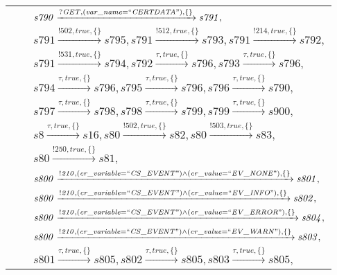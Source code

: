 \begin{tabular}{lcp{350px}}
& & $\mathit{s790}\xrightarrow{\mathit{?GET}, \mathit{(var\_name = ``CERTDATA")}, \{\}}\mathit{s791},$ \\
& & $\mathit{s791}\xrightarrow{\mathit{!502}, \mathit{true}, \{\}}\mathit{s795},\mathit{s791}\xrightarrow{\mathit{!512}, \mathit{true}, \{\}}\mathit{s793},\mathit{s791}\xrightarrow{\mathit{!214}, \mathit{true}, \{\}}\mathit{s792},$ \\
& & $\mathit{s791}\xrightarrow{\mathit{!531}, \mathit{true}, \{\}}\mathit{s794},\mathit{s792}\xrightarrow{\mathit{\tau}, \mathit{true}, \{\}}\mathit{s796},\mathit{s793}\xrightarrow{\mathit{\tau}, \mathit{true}, \{\}}\mathit{s796},$ \\
& & $\mathit{s794}\xrightarrow{\mathit{\tau}, \mathit{true}, \{\}}\mathit{s796},\mathit{s795}\xrightarrow{\mathit{\tau}, \mathit{true}, \{\}}\mathit{s796},\mathit{s796}\xrightarrow{\mathit{\tau}, \mathit{true}, \{\}}\mathit{s790},$ \\
& & $\mathit{s797}\xrightarrow{\mathit{\tau}, \mathit{true}, \{\}}\mathit{s798},\mathit{s798}\xrightarrow{\mathit{\tau}, \mathit{true}, \{\}}\mathit{s799},\mathit{s799}\xrightarrow{\mathit{\tau}, \mathit{true}, \{\}}\mathit{s900},$ \\
& & $\mathit{s8}\xrightarrow{\mathit{\tau}, \mathit{true}, \{\}}\mathit{s16},\mathit{s80}\xrightarrow{\mathit{!502}, \mathit{true}, \{\}}\mathit{s82},\mathit{s80}\xrightarrow{\mathit{!503}, \mathit{true}, \{\}}\mathit{s83},$ \\
& & $\mathit{s80}\xrightarrow{\mathit{!250}, \mathit{true}, \{\}}\mathit{s81},$ \\
& & $\mathit{s800}\xrightarrow{\mathit{!210}, \mathit{(cr\_variable = ``CS\_EVENT") \land (cr\_value = ``EV\_NONE")}, \{\}}\mathit{s801},$ \\
& & $\mathit{s800}\xrightarrow{\mathit{!210}, \mathit{(cr\_variable = ``CS\_EVENT") \land (cr\_value = ``EV\_INFO")}, \{\}}\mathit{s802},$ \\
& & $\mathit{s800}\xrightarrow{\mathit{!210}, \mathit{(cr\_variable = ``CS\_EVENT") \land (cr\_value = ``EV\_ERROR")}, \{\}}\mathit{s804},$ \\
& & $\mathit{s800}\xrightarrow{\mathit{!210}, \mathit{(cr\_variable = ``CS\_EVENT") \land (cr\_value = ``EV\_WARN")}, \{\}}\mathit{s803},$ \\
& & $\mathit{s801}\xrightarrow{\mathit{\tau}, \mathit{true}, \{\}}\mathit{s805},\mathit{s802}\xrightarrow{\mathit{\tau}, \mathit{true}, \{\}}\mathit{s805},\mathit{s803}\xrightarrow{\mathit{\tau}, \mathit{true}, \{\}}\mathit{s805},$ \\

\end{tabular}
